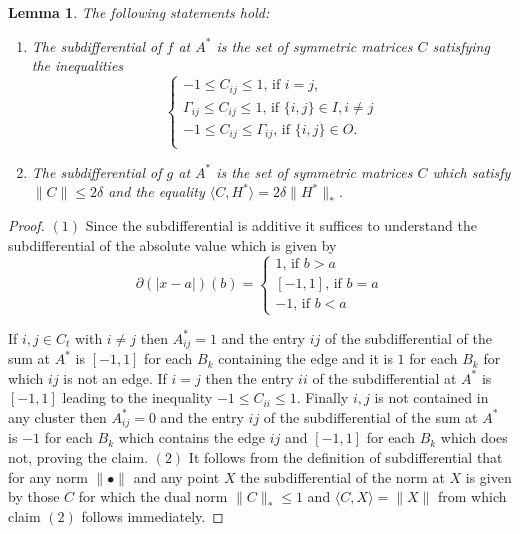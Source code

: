 \documentclass[12pt]{amsart}
\newtheorem{lemma}{Lemma}[section]
\theoremstyle{remark}
\begin{document}
\begin{lemma} The following statements hold:
\label{lem: subdiff}
\begin{enumerate}
\item The subdifferential of $f$ at $A^*$ is the set of symmetric matrices $C$ satisfying the inequalities
\[
\begin{cases}
-1 \leq C_{ij}\leq 1 \text{, if $i=j$, }\\
\Gamma_{ij} \leq C_{ij}\leq 1 \text{, if $\{i,j\}\in I, i\neq j$}\\
-1\leq C_{ij} \leq \Gamma_{ij}\text{, if $\{i,j\} \in O$.}\\
\end{cases}
\]
\item The subdifferential of $g$ at $A^*$ is the set of symmetric matrices $C$ which satisfy $\|C\|\leq 2\delta$ and the equality $\langle C, H^*\rangle = 2\delta\|H^*\|_*$.

\end{enumerate}

\end{lemma}
\begin{proof} $(1)$ Since the subdifferential is additive it suffices to understand the subdifferential of the absolute value which is given by
\[
\partial(|x-a|)(b)=
\begin{cases}
1\text{, if $b>a$}\\
[-1,1]\text{, if $b=a$}\\
-1\text{, if $b<a$}
\end{cases}
\]

 If $i,j\in C_t$ with $i\neq j$ then $A^*_{ij}=1$ and the entry $ij$ of the subdifferential of the sum at $A^*$ is $[-1,1]$ for each $B_k$ containing the edge and it is $1$ for each $B_k$ for which $ij$ is not an edge. If $i=j$ then the entry $ii$ of the subdifferential at $A^*$ is $[-1,1]$ leading to the inequality $-1\leq C_{ii}\leq 1$. Finally $i,j$ is not contained in any cluster then $A^*_{ij}=0$ and the entry $ij$ of the subdifferential of the sum at $A^*$ is $-1$ for each $B_k$ which contains the edge $ij$ and $[-1,1]$ for each $B_k$ which does not, proving the claim. $(2)$ It follows from the definition of subdifferential that for any norm $\|\bullet\|$ and any point $X$ the subdifferential of the norm at $X$ is given by those $C$ for which the dual norm $\|C\|_*\leq 1$ and $\langle C,X\rangle =\|X\|$ from which claim $(2)$ follows immediately.
\end{proof}
\end{document}
